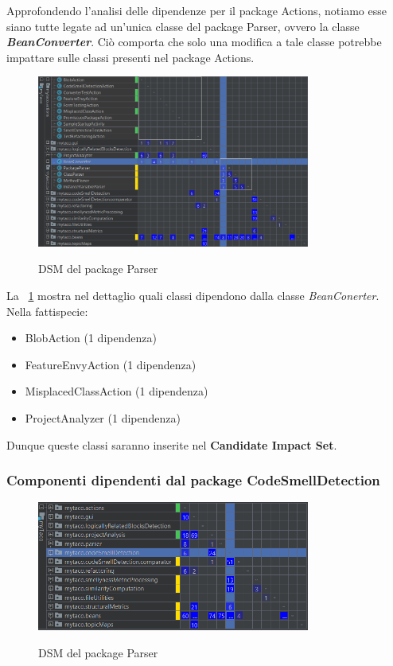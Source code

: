 	Approfondendo l'analisi delle dipendenze per il package Actions, notiamo esse siano tutte legate ad un'unica classe del package Parser, ovvero la classe \textbf{\textit{BeanConverter}}. Ciò comporta che solo una modifica a tale classe potrebbe impattare sulle classi presenti nel package Actions.
	
	\begin{figure}[h!]
		\centering
		\includegraphics[width=0.8\textwidth]{dsm1.png}\\[1cm]
		\caption{DSM del package Parser}
		\label{dsm2}
	\end{figure}

	La \figurename~\ref{dsm2} mostra nel dettaglio quali classi dipendono dalla classe \textit{BeanConerter}. Nella fattispecie:
	
	\begin{itemize}
		
		\item BlobAction (1 dipendenza)
		
		\item FeatureEnvyAction (1 dipendenza)
		
		\item MisplacedClassAction (1 dipendenza)
		
		\item ProjectAnalyzer (1 dipendenza)

		
	\end{itemize}
	
	Dunque queste classi saranno inserite nel \textbf{Candidate Impact Set}.
	
	\subsubsection{Componenti dipendenti dal package CodeSmellDetection}
	
	\begin{figure}[h!]
		\centering
		\includegraphics[width=0.8\textwidth]{dsm3.png}\\[1cm]
		\caption{DSM del package Parser}
		\label{dsm3}
	\end{figure}
	
